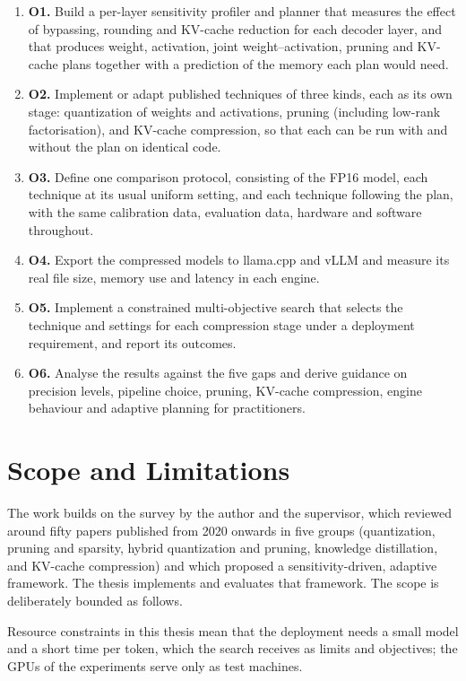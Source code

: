 \documentclass[
11pt, %
english, %
singlespacing, %
headsepline, %
]{MastersDoctoralThesis} %
\begin{document}
\begin{enumerate}
  \item \textbf{O1.} Build a per-layer sensitivity profiler and planner that measures the effect of bypassing, rounding and KV-cache reduction for each decoder layer, and that produces weight, activation, joint weight--activation, pruning and KV-cache plans together with a prediction of the memory each plan would need.
  \item \textbf{O2.} Implement or adapt published techniques of three kinds, each as its own stage: quantization of weights and activations, pruning (including low-rank factorisation), and KV-cache compression, so that each can be run with and without the plan on identical code.
  \item \textbf{O3.} Define one comparison protocol, consisting of the FP16 model, each technique at its usual uniform setting, and each technique following the plan, with the same calibration data, evaluation data, hardware and software throughout.
  \item \textbf{O4.} Export the compressed models to llama.cpp and vLLM and measure its real file size, memory use and latency in each engine.
  \item \textbf{O5.} Implement a constrained multi-objective search that selects the technique and settings for each compression stage under a deployment requirement, and report its outcomes.
  \item \textbf{O6.} Analyse the results against the five gaps and derive guidance on precision levels, pipeline choice, pruning, KV-cache compression, engine behaviour and adaptive planning for practitioners.
\end{enumerate}

\section{Scope and Limitations}
\label{sec:ch1-scope}

The work builds on the survey by the author and the supervisor, which reviewed around fifty papers published from 2020 onwards in five groups (quantization, pruning and sparsity, hybrid quantization and pruning, knowledge distillation, and KV-cache compression) and which proposed a sensitivity-driven, adaptive framework. The thesis implements and evaluates that framework. The scope is deliberately bounded as follows.

Resource constraints in this thesis mean that the deployment needs a small model and a short time per token, which the search receives as limits and objectives; the GPUs of the experiments serve only as test machines.
\end{document}
